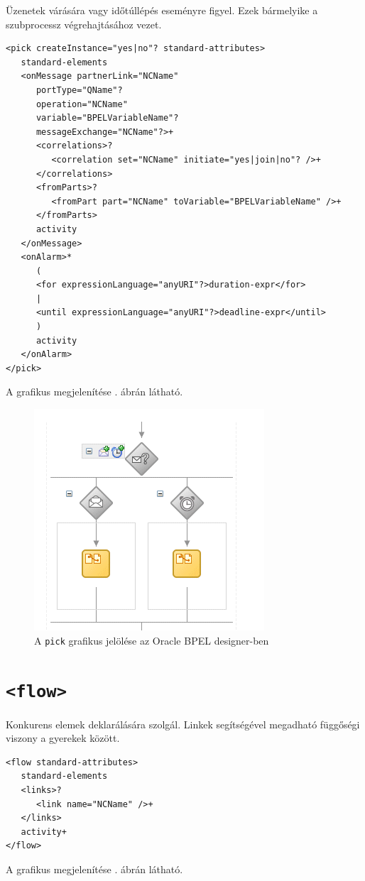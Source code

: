 Üzenetek várására vagy időtúllépés eseményre figyel. Ezek bármelyike a szubprocessz végrehajtásához vezet. 
\begin{verbatim}
<pick createInstance="yes|no"? standard-attributes>
   standard-elements
   <onMessage partnerLink="NCName"
      portType="QName"?
      operation="NCName"
      variable="BPELVariableName"?
      messageExchange="NCName"?>+
      <correlations>?
         <correlation set="NCName" initiate="yes|join|no"? />+
      </correlations>
      <fromParts>?
         <fromPart part="NCName" toVariable="BPELVariableName" />+
      </fromParts>
      activity
   </onMessage>
   <onAlarm>*
      (
      <for expressionLanguage="anyURI"?>duration-expr</for>
      |
      <until expressionLanguage="anyURI"?>deadline-expr</until>
      )
      activity
   </onAlarm>
</pick>
\end{verbatim}
A grafikus megjelenítése . ábrán látható.

\begin{figure}[h!]
\centering
\includegraphics[scale=1]{images/pick.png}
\caption{A \texttt{pick} grafikus jelölése az Oracle BPEL designer-ben}
\label{fig:pick}
\end{figure}

\section{\texttt{<flow>}}

Konkurens elemek deklarálására szolgál. Linkek segítségével megadható függőségi viszony a gyerekek között. 
\begin{verbatim}
<flow standard-attributes>
   standard-elements
   <links>?
      <link name="NCName" />+
   </links>
   activity+
</flow>
\end{verbatim} 
A grafikus megjelenítése . ábrán látható.

